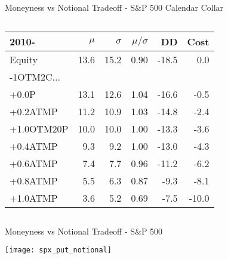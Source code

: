 \documentclass{beamer}
\begin{document}
\begin{frame}{Moneyness vs Notional Tradeoff - S\&P 500 Calendar Collar}
\begin{columns}
\begin{column}{0.5\textwidth}
{\begin{tabular}{lrrrrr}
\toprule
2010- & $\mu$ & $\sigma$ & $\mu/\sigma$ & DD & Cost\\
\midrule
Equity & 13.6 & 15.2 & 0.90 & -18.5 & 0.0\\
\addlinespace
-1OTM2C...\\
+0.0P & 13.1 & 12.6 & 1.04 & -16.6 & -0.5\\
+0.2ATMP & 11.2 & 10.9 & 1.03 & -14.8 & -2.4\\
+1.0OTM20P & 10.0 & 10.0 & 1.00 & -13.3 & -3.6\\
+0.4ATMP & 9.3 & 9.2 & 1.00 & -13.0 & -4.3\\
+0.6ATMP & 7.4 & 7.7 & 0.96 & -11.2 & -6.2\\
+0.8ATMP & 5.5 & 6.3 & 0.87 & -9.3 & -8.1\\
+1.0ATMP & 3.6 & 5.2 & 0.69 & -7.5 & -10.0\\
\bottomrule
\end{tabular}

}

\end{column}

\end{columns}

\end{frame}


\begin{frame}{Moneyness vs Notional Tradeoff - S\&P 500}

\texttt{[image: spx\_put\_notional]}
\end{frame}
\end{document}
